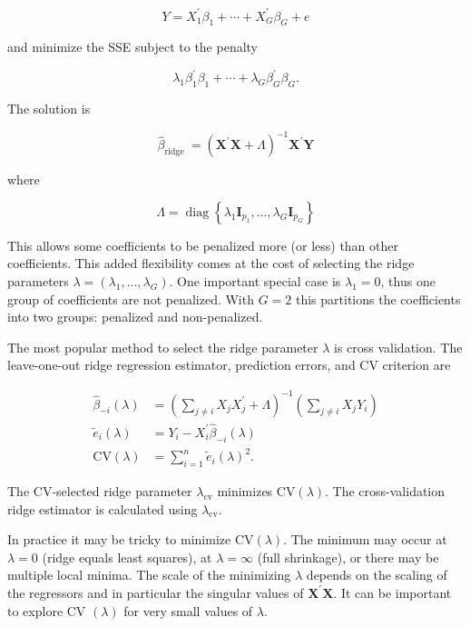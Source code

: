 \documentclass[10pt]{article}
\begin{document}
$$
Y=X_{1}^{\prime} \beta_{1}+\cdots+X_{G}^{\prime} \beta_{G}+e
$$

and minimize the SSE subject to the penalty

$$
\lambda_{1} \beta_{1}^{\prime} \beta_{1}+\cdots+\lambda_{G} \beta_{G}^{\prime} \beta_{G} .
$$

The solution is

$$
\widehat{\beta}_{\text {ridge }}=\left(\boldsymbol{X}^{\prime} \boldsymbol{X}+\Lambda\right)^{-1} \boldsymbol{X}^{\prime} \boldsymbol{Y}
$$

where

$$
\Lambda=\operatorname{diag}\left\{\lambda_{1} \boldsymbol{I}_{p_{1}}, \ldots, \lambda_{G} \boldsymbol{I}_{p_{G}}\right\}
$$

This allows some coefficients to be penalized more (or less) than other coefficients. This added flexibility comes at the cost of selecting the ridge parameters $\lambda=\left(\lambda_{1}, \ldots, \lambda_{G}\right)$. One important special case is $\lambda_{1}=0$, thus one group of coefficients are not penalized. With $G=2$ this partitions the coefficients into two groups: penalized and non-penalized.

The most popular method to select the ridge parameter $\lambda$ is cross validation. The leave-one-out ridge regression estimator, prediction errors, and CV criterion are

$$
\begin{aligned}
\widehat{\beta}_{-i}(\lambda) &=\left(\sum_{j \neq i} X_{j} X_{j}^{\prime}+\Lambda\right)^{-1}\left(\sum_{j \neq i} X_{j} Y_{i}\right) \\
\widetilde{e}_{i}(\lambda) &=Y_{i}-X_{i}^{\prime} \widehat{\beta}_{-i}(\lambda) \\
\mathrm{CV}(\lambda) &=\sum_{i=1}^{n} \widetilde{e}_{i}(\lambda)^{2} .
\end{aligned}
$$

The CV-selected ridge parameter $\lambda_{\mathrm{cv}}$ minimizes $\mathrm{CV}(\lambda)$. The cross-validation ridge estimator is calculated using $\lambda_{\mathrm{cv}}$.

In practice it may be tricky to minimize $\mathrm{CV}(\lambda)$. The minimum may occur at $\lambda=0$ (ridge equals least squares), at $\lambda=\infty$ (full shrinkage), or there may be multiple local minima. The scale of the minimizing $\lambda$ depends on the scaling of the regressors and in particular the singular values of $\boldsymbol{X}^{\prime} \boldsymbol{X}$. It can be important to explore CV $(\lambda)$ for very small values of $\lambda$.
\end{document}
